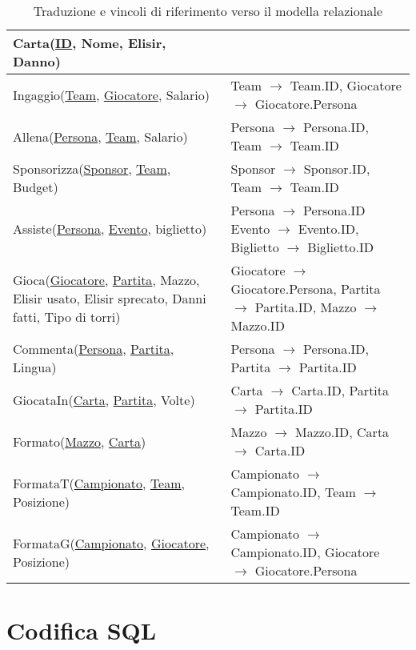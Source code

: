 \documentclass{article}
\begin{document}
\begin{table}
\begin{tabularx}{\textwidth}{|X|X|}
        Carta(\underline{ID}, Nome, Elisir, Danno) & \\ \hline
        Ingaggio(\underline{Team}, \underline{Giocatore}, Salario) & Team $\xrightarrow{}$ Team.ID, Giocatore $\xrightarrow{}$ Giocatore.Persona \\ \hline %
        Allena(\underline{Persona}, \underline{Team}, Salario) & Persona $\xrightarrow{}$ Persona.ID, Team $\xrightarrow{}$ Team.ID \\ \hline
        Sponsorizza(\underline{Sponsor}, \underline{Team}, Budget) & Sponsor $\xrightarrow{}$ Sponsor.ID, Team $\xrightarrow{}$ Team.ID \\ \hline
        Assiste(\underline{Persona}, \underline{Evento}, biglietto) & Persona $\xrightarrow{}$ Persona.ID Evento $\xrightarrow{}$ Evento.ID, Biglietto $\xrightarrow{}$ Biglietto.ID \\ \hline
        Gioca(\underline{Giocatore}, \underline{Partita}, Mazzo, Elisir usato, Elisir sprecato, Danni fatti, Tipo di torri) & Giocatore $\xrightarrow{}$ Giocatore.Persona, Partita $\xrightarrow{}$ Partita.ID, Mazzo $\xrightarrow{}$ Mazzo.ID \\ \hline
        Commenta(\underline{Persona}, \underline{Partita}, Lingua) & Persona $\xrightarrow{}$ Persona.ID, Partita $\xrightarrow{}$ Partita.ID \\ \hline
        GiocataIn(\underline{Carta}, \underline{Partita}, Volte) & Carta $\xrightarrow{}$ Carta.ID, Partita $\xrightarrow{}$ Partita.ID \\ \hline
        Formato(\underline{Mazzo}, \underline{Carta}) & Mazzo $\xrightarrow{}$ Mazzo.ID, Carta $\xrightarrow{}$ Carta.ID \\ \hline
        FormataT(\underline{Campionato}, \underline{Team}, Posizione) & Campionato $\xrightarrow{}$ Campionato.ID, Team $\xrightarrow{}$ Team.ID \\ \hline
        FormataG(\underline{Campionato}, \underline{Giocatore}, Posizione) & Campionato $\xrightarrow{}$ Campionato.ID, Giocatore $\xrightarrow{}$ Giocatore.Persona \\ \hline
    \end{tabularx}
    \caption{Traduzione e vincoli di riferimento verso il modella relazionale}
    \label{table_traduzione_vincoli_riferimento}
\end{table}

\section{Codifica SQL}
\end{document}
